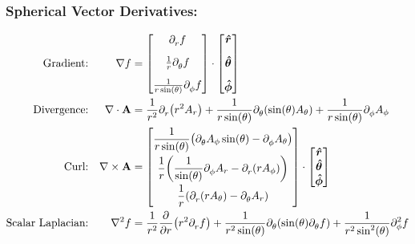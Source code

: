     \subsubsection*{Spherical Vector Derivatives:}
    \length[0.7cm]
    \begin{align*}
    \text{Gradient:}&&
    \nabla f &=
    \left[
    \begin{matrix}
    \pder*{r}f
    \\[0.3 cm]
    \frac{1}{r} \pder*{\theta}f
    \\[0.3 cm]
    \frac{1}{r \sin(\theta)}\pder*{\phi}f
    \end{matrix}\right]
    \cdot
    \left[
    \begin{matrix}
    \e{r}
    \\[0.3 cm]
    \e{\theta}
    \\[0.3 cm]
    \e{\phi}
    \end{matrix}\right]
    \\
    \text{Divergence:}&&
    \nabla \cdot \vb{A} &= \oo{r^2} \pder*{r}\qty(r^2A_r) + \oo{r \sin(\theta)} \pder*{\theta} \qty(\sin(\theta)A_\theta) + \oo{r \sin(\theta)} \pder*{\phi}A_\phi 
    \\
    \text{Curl:}&&
    \nabla \times \vb{A} &= 
    \left[
    \begin{matrix}
    \mathlarger{\frac{1}{r\sin(\theta)} \qty(\pder*{\theta}A_\phi\sin(\theta)-\pder*{\phi}A_\theta)}
    \\[0.3 cm]
    \mathlarger{\oo{r}\qty(\oo{\sin(\theta)}\pder*{\phi}A_r-\pder*{r}\qty(r A_{\phi}))}
    \\[0.3 cm]
    \mathlarger{\frac{1}{r}\qty(\pder*{r}\qty(rA_{\theta}) - \pder*{\theta}A_r)}
    \end{matrix}\right]
    \cdot
    \left[
    \begin{matrix}
    \e{r}
    \\
    \e{\theta} 
    \\
    \e{\phi}
    \end{matrix}\right]
    \\
    \text{Scalar Laplacian:}&&
    \nabla^2 f 
    &= \frac{1}{r^2} \pder{r}\qty(r^2 \pder*{r}f) + \oo{r^2 \sin(\theta)} \pder*{\theta} \qty(\sin(\theta)\pder*{\theta}f) +\frac{1}{r^2 \sin^2(\theta)} \pder*[2]{\phi}f
    \end{align*}
    \length


\newpage
